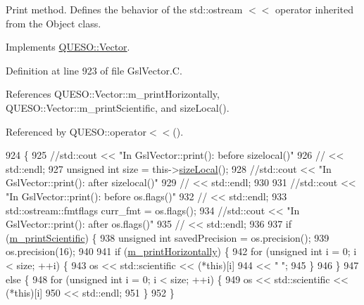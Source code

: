 Print method. Defines the behavior of the std\-::ostream $<$$<$ operator inherited from the Object class. 



Implements \hyperlink{class_q_u_e_s_o_1_1_vector_a7bd70a5181fbc2f20aaac46b0a9e3c72}{Q\-U\-E\-S\-O\-::\-Vector}.



Definition at line 923 of file Gsl\-Vector.\-C.



References Q\-U\-E\-S\-O\-::\-Vector\-::m\-\_\-print\-Horizontally, Q\-U\-E\-S\-O\-::\-Vector\-::m\-\_\-print\-Scientific, and size\-Local().



Referenced by Q\-U\-E\-S\-O\-::operator$<$$<$().


\begin{DoxyCode}
924 \{
925   \textcolor{comment}{//std::cout << "In GslVector::print(): before sizelocal()"}
926   \textcolor{comment}{//          << std::endl;}
927   \textcolor{keywordtype}{unsigned} \textcolor{keywordtype}{int} size = this->\hyperlink{class_q_u_e_s_o_1_1_gsl_vector_ace6fb1739b7cf6456b3dcde84c766fb3}{sizeLocal}();
928   \textcolor{comment}{//std::cout << "In GslVector::print(): after sizelocal()"}
929   \textcolor{comment}{//          << std::endl;}
930 
931   \textcolor{comment}{//std::cout << "In GslVector::print(): before os.flags()"}
932   \textcolor{comment}{//          << std::endl;}
933   std::ostream::fmtflags curr\_fmt = os.flags();
934   \textcolor{comment}{//std::cout << "In GslVector::print(): after os.flags()"}
935   \textcolor{comment}{//          << std::endl;}
936 
937   \textcolor{keywordflow}{if} (\hyperlink{class_q_u_e_s_o_1_1_vector_a55d8e946571a9491a028ecb9a8a992a4}{m\_printScientific}) \{
938     \textcolor{keywordtype}{unsigned} \textcolor{keywordtype}{int} savedPrecision = os.precision();
939     os.precision(16);
940 
941     \textcolor{keywordflow}{if} (\hyperlink{class_q_u_e_s_o_1_1_vector_a6bc4326d0e4f44f015bf2e30c7ee620d}{m\_printHorizontally}) \{
942       \textcolor{keywordflow}{for} (\textcolor{keywordtype}{unsigned} \textcolor{keywordtype}{int} i = 0; i < size; ++i) \{
943         os << std::scientific << (*this)[i]
944            << \textcolor{stringliteral}{" "};
945       \}
946     \}
947     \textcolor{keywordflow}{else} \{
948       \textcolor{keywordflow}{for} (\textcolor{keywordtype}{unsigned} \textcolor{keywordtype}{int} i = 0; i < size; ++i) \{
949         os << std::scientific << (*this)[i]
950            << std::endl;
951       \}
952     \}

\end{DoxyCode}
